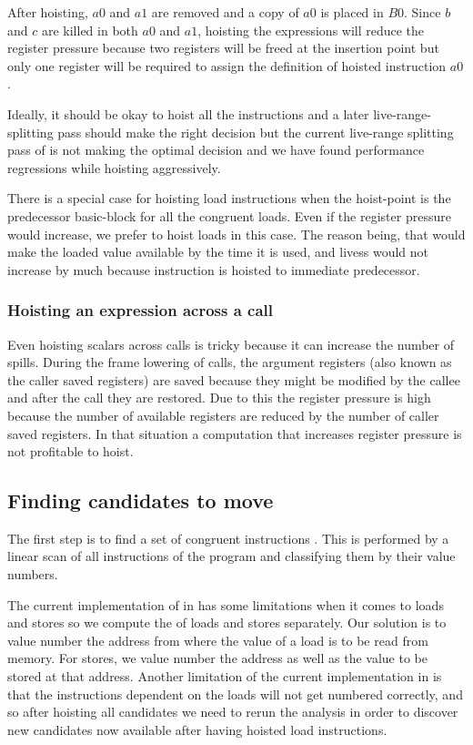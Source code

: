 \documentclass[sigplan,10pt,review,anonymous]{acmart}\settopmatter{printfolios=true,printccs=false,printacmref=false}
\begin{document}
After hoisting, $a0$ and $a1$ are removed and a copy of $a0$ is placed in
$B0$. Since $b$ and $c$ are killed in both $a0$ and $a1$, hoisting the
expressions will reduce the register pressure because two registers will be
freed at the insertion point but only one register will be required to assign
the definition of hoisted instruction $a0$.

Ideally, it should be okay to hoist all the instructions and a later
live-range-splitting \cite{cooper1998live} pass should make the right decision
but the current live-range splitting pass of \LLVM{} is not making the optimal
decision and we have found performance regressions while hoisting aggressively.

There is a special case for hoisting load instructions when the hoist-point is
the predecessor basic-block for all the congruent loads. Even if the register
pressure would increase, we prefer to hoist loads in this case. The reason
being, that would make the loaded value available by the time it is used, and
livess would not increase by much because instruction is hoisted to immediate
predecessor.


\subsubsection{Hoisting an expression across a call}
\label{cost:across-calls}
Even hoisting scalars across calls is tricky because it can increase the number
of spills. During the frame lowering of calls, the argument registers (also
known as the caller saved registers) are saved because they might be modified by
the callee and after the call they are restored. Due to this the register
pressure is high because the number of available registers are reduced by the
number of caller saved registers. In that situation a computation that increases
register pressure is not profitable to hoist.


\subsection{Finding candidates to move}
\label{subsec:finding-candidates}
The first step is to find a set of congruent instructions
\cite{briggs1997}. This is performed by a linear scan of all instructions of the
program and classifying them by their value numbers.

The current implementation of \GVN{} in \LLVM{} has some limitations when it
comes to loads and stores so we compute the \GVN{} of loads and stores
separately.  Our solution is to value number the address from where the value of
a load is to be read from memory. For stores, we value number the address as
well as the value to be stored at that address. Another limitation of the
current \GVN{} implementation in \LLVM{} is that the instructions dependent on
the loads will not get numbered correctly, and so after hoisting all candidates
we need to rerun the \GVN{} analysis in order to discover new candidates now
available after having hoisted load instructions.
\end{document}
